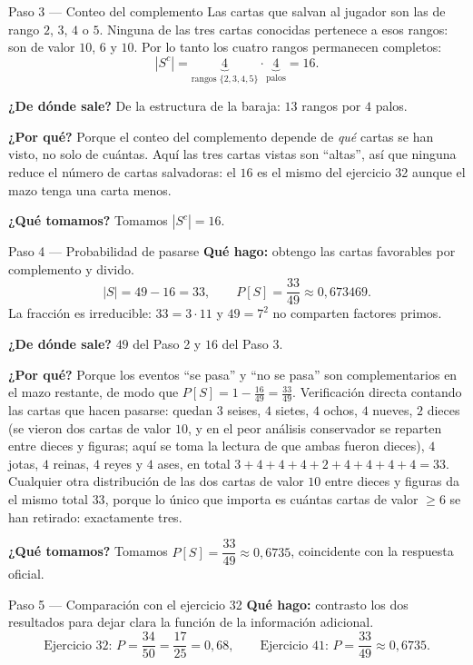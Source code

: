 \documentclass[11pt]{article}
\begin{document}
\begin{sol}
\begin{paso}{Paso 3 --- Conteo del complemento}
Las cartas que salvan al jugador son las de rango $2$, $3$, $4$ o $5$. Ninguna de las tres cartas conocidas pertenece a esos rangos: son de valor $10$, $6$ y $10$. Por lo tanto los cuatro rangos permanecen completos:
\[
|S^{c}|=\underbrace{4}_{\text{rangos }\{2,3,4,5\}}\cdot\underbrace{4}_{\text{palos}}=16 .
\]

\textbf{¿De d\'onde sale?} De la estructura de la baraja: $13$ rangos por $4$ palos.

\textbf{¿Por qu\'e?} Porque el conteo del complemento depende de \emph{qu\'e} cartas se han visto, no solo de cu\'antas. Aqu\'i las tres cartas vistas son ``altas'', as\'i que ninguna reduce el n\'umero de cartas salvadoras: el $16$ es el mismo del ejercicio 32 aunque el mazo tenga una carta menos.

\textbf{¿Qu\'e tomamos?} Tomamos $|S^{c}|=16$.
\end{paso}

\begin{paso}{Paso 4 --- Probabilidad de pasarse}
\textbf{Qu\'e hago:} obtengo las cartas favorables por complemento y divido.
\[
|S|=49-16=33,
\qquad
P[S]=\frac{33}{49}\approx 0{,}673469 .
\]
La fracci\'on es irreducible: $33=3\cdot 11$ y $49=7^{2}$ no comparten factores primos.

\textbf{¿De d\'onde sale?} $49$ del Paso 2 y $16$ del Paso 3.

\textbf{¿Por qu\'e?} Porque los eventos ``se pasa'' y ``no se pasa'' son complementarios en el mazo restante, de modo que $P[S]=1-\frac{16}{49}=\frac{33}{49}$. Verificaci\'on directa contando las cartas que hacen pasarse: quedan $3$ seises, $4$ sietes, $4$ ochos, $4$ nueves, $2$ dieces (se vieron dos cartas de valor $10$, y en el peor an\'alisis conservador se reparten entre dieces y figuras; aqu\'i se toma la lectura de que ambas fueron dieces), $4$ jotas, $4$ reinas, $4$ reyes y $4$ ases, en total $3+4+4+4+2+4+4+4+4=33$. Cualquier otra distribuci\'on de las dos cartas de valor $10$ entre dieces y figuras da el mismo total $33$, porque lo \'unico que importa es cu\'antas cartas de valor $\ge 6$ se han retirado: exactamente tres.

\textbf{¿Qu\'e tomamos?} Tomamos $P[S]=\dfrac{33}{49}\approx 0{,}6735$, coincidente con la respuesta oficial.
\end{paso}

\begin{paso}{Paso 5 --- Comparaci\'on con el ejercicio 32}
\textbf{Qu\'e hago:} contrasto los dos resultados para dejar clara la funci\'on de la informaci\'on adicional.
\[
\text{Ejercicio 32: } P=\frac{34}{50}=\frac{17}{25}=0{,}68,
\qquad
\text{Ejercicio 41: } P=\frac{33}{49}\approx 0{,}6735 .
\]


\end{paso}
\end{sol}
\end{document}
